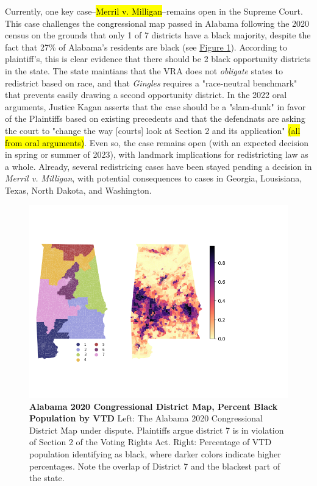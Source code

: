\documentclass{article}
\begin{document}
\par 
Currently, one key case--\hl{Merril v. Milligan}--remains open in the Supreme Court. This case challenges the congressional map passed in Alabama following the 2020 census on the grounds that only 1 of 7 districts have a black majority, despite the fact that 27\% of Alabama's residents are black (see \hyperref[fig 1]{Figure 1}). According to plaintiff's, this is clear evidence that there should be 2 black opportunity districts in the state. The state maintians that the VRA does not \emph{obligate} states to redistrict based on race, and that \emph{Gingles} requires a "race-neutral benchmark" that prevents easily drawing a second opportunity district. In the 2022 oral arguments, Justice Kagan asserts that the case should be a "slam-dunk" in favor of the Plaintiffs based on existing precedents and that the defendnats are asking the court to "change the way [courts] look at Section 2 and its application" \hl{(all from oral arguments)}. Even so, the case remains open (with an expected decision in spring or summer of 2023), with landmark implications for redistricting law as a whole. Already, several redistricing cases have been stayed pending a decision in \emph{Merril v. Milligan}, with potential consequences to cases in Georgia, Lousisiana, Texas, North Dakota, and Washington.

\begin{figure}[h]\label{fig 1}
    \centering
    \includegraphics[trim={0cm 2cm 4cm 2},clip,scale=.75]{images/AL.png}
    \caption{\textbf{Alabama 2020 Congressional District Map, Percent Black Population by VTD} Left: The Alabama 2020 Congressional District Map under dispute. Plaintiffs argue district 7 is in violation of Section 2 of the Voting Rights Act. Right: Percentage of VTD population identifying as black, where darker colors indicate higher percentages. Note the overlap of District 7 and the blackest part of the state.}
\end{figure}
\end{document}
